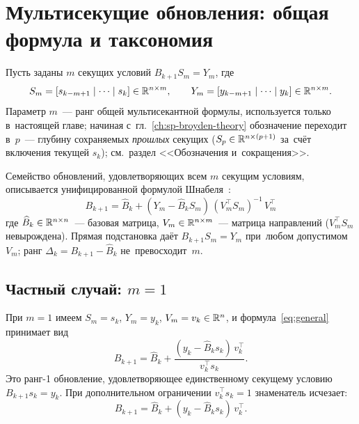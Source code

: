 \section{Мультисекущие обновления: общая формула и таксономия}\label{sec:ch1_multisecant}

Пусть заданы $m$ секущих условий $B_{k+1} S_m = Y_m$, где
\[
  S_m = [s_{k-m+1}\mid\cdots\mid s_k] \in \mathbb{R}^{n \times m}, \qquad
  Y_m = [y_{k-m+1}\mid\cdots\mid y_k] \in \mathbb{R}^{n \times m}.
\]
Параметр $m$~--- ранг общей мультисекантной формулы, используется только
в~настоящей главе; начиная с~гл.~\ref{ch:sp-broyden-theory} обозначение
переходит в~$p$~--- глубину сохраняемых \emph{прошлых} секущих
($S_p\in\mathbb{R}^{n\times(p+1)}$ за~счёт включения текущей $s_k$);
см.~раздел <<Обозначения и~сокращения>>.

Семейство обновлений, удовлетворяющих всем $m$ секущим условиям,
описывается унифицированной формулой
Шнабеля~\cite[ур.~(2.5)]{schnabel1983}:
\begin{equation}\label{eq:general}
  \boxed{
    B_{k+1} = \widehat{B}_k + (Y_m - \widehat{B}_k S_m)\,(V_m^\top S_m)^{-1}\,V_m^\top
  }
\end{equation}
где $\widehat{B}_k \in \mathbb{R}^{n \times n}$~--- базовая матрица,
$V_m \in \mathbb{R}^{n \times m}$~--- матрица направлений
($V_m^\top S_m$ невырождена). Прямая подстановка даёт
$B_{k+1} S_m = Y_m$ при~любом допустимом~$V_m$; ранг
$\Delta_k = B_{k+1}-\widehat{B}_k$ не~превосходит~$m$.

\subsection*{Частный случай: $m = 1$}

При $m = 1$ имеем $S_m = s_k$, $Y_m = y_k$, $V_m = v_k \in \mathbb{R}^n$,
и формула~\eqref{eq:general} принимает вид
\begin{equation}\label{eq:rank1}
  B_{k+1} = \widehat{B}_k + \frac{(y_k - \widehat{B}_k s_k)\,v_k^\top}{v_k^\top s_k}.
\end{equation}
Это ранг-1 обновление, удовлетворяющее единственному секущему условию
$B_{k+1} s_k = y_k$. При дополнительном ограничении $v_k^\top s_k = 1$
знаменатель исчезает:
\begin{equation}\label{eq:rank1_normalized}
  B_{k+1} = \widehat{B}_k + (y_k - \widehat{B}_k s_k)\,v_k^\top.
\end{equation}

